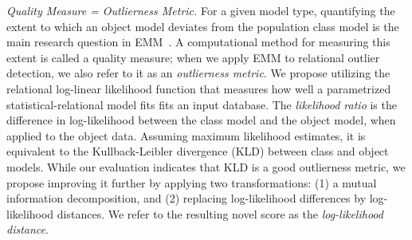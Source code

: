 {{\em Quality Measure = Outlierness Metric.} For a given model type, quantifying the extent to which an object model deviates from the population class model is the main research question in EMM~\cite{Duivesteijn2016}. A computational method for measuring this extent is called a quality measure; when we apply EMM to relational outlier detection, we also refer to it as an {\em outlierness metric}. We propose utilizing the relational log-linear likelihood function \cite{Kimmig2014,Schulte2011} that measures how well a parametrized statistical-relational model fits fits an input database. The {\em likelihood ratio} is the difference in log-likelihood between the class model and the object model, when applied to the object data. Assuming maximum likelihood estimates, it is equivalent to the Kullback-Leibler divergence (KLD) between class and object models. While our evaluation indicates that KLD is a good outlierness metric, we propose improving it further by applying two transformations: (1) a mutual information decomposition, and (2) replacing log-likelihood differences by log-likelihood distances. We refer to the resulting novel score as the {\em log-likelihood distance}. 


}
